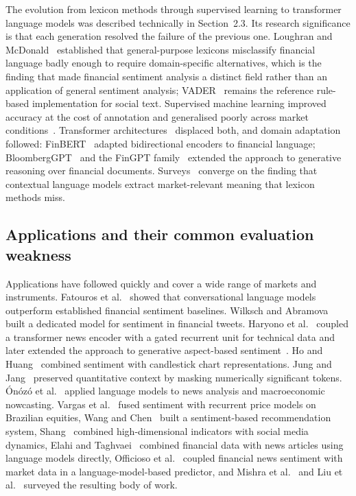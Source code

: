 The evolution from lexicon methods through supervised learning to transformer language models
was described technically in Section~2.3. Its research significance is that each generation
resolved the failure of the previous one. Loughran and McDonald~\cite{loughran2011} established
that general-purpose lexicons misclassify financial language badly enough to require
domain-specific alternatives, which is the finding that made financial sentiment analysis a
distinct field rather than an application of general sentiment analysis;
VADER~\cite{hutto2014} remains the reference rule-based implementation for social text.
Supervised machine learning improved accuracy at the cost of annotation and generalised poorly
across market conditions~\cite{rouf2021}. Transformer architectures~\cite{vaswani2017} displaced
both, and domain adaptation followed: FinBERT~\cite{araci2019} adapted bidirectional encoders to
financial language; BloombergGPT~\cite{wu2023bloomberggpt} and the FinGPT
family~\cite{yang2023fingpt,wang2024fingptbench} extended the approach to generative reasoning
over financial documents. Surveys~\cite{li2024llmsurvey,todd2024,bahoo2024} converge on the
finding that contextual language models extract market-relevant meaning that lexicon methods
miss.

\subsection{Applications and their common evaluation weakness}

Applications have followed quickly and cover a wide range of markets and instruments. Fatouros
et al.~\cite{fatouros2024} showed that conversational language models outperform established
financial sentiment baselines. Wilksch and Abramova~\cite{wilksch2024} built a dedicated model
for sentiment in financial tweets. Haryono et al.~\cite{haryono2023} coupled a transformer news
encoder with a gated recurrent unit for technical data and later extended the approach to
generative aspect-based sentiment~\cite{haryono2024}. Ho and Huang~\cite{ho2021} combined
sentiment with candlestick chart representations. Jung and Jang~\cite{jung2024} preserved
quantitative context by masking numerically significant tokens. Ónózó et
al.~\cite{onozo2024} applied language models to news analysis and macroeconomic nowcasting.
Vargas et al.~\cite{vargas2022} fused sentiment with recurrent price models on Brazilian
equities, Wang and Chen~\cite{wang2024spcm} built a sentiment-based recommendation system,
Shang~\cite{shang2025} combined high-dimensional indicators with social media dynamics, Elahi
and Taghvaei~\cite{elahi2024} combined financial data with news articles using language models
directly, Officioso et al.~\cite{officioso2026} coupled financial news sentiment with market
data in a language-model-based predictor, and Mishra et al.~\cite{mishra2025} and Liu et
al.~\cite{liu2024llmreview} surveyed the resulting body of work.

